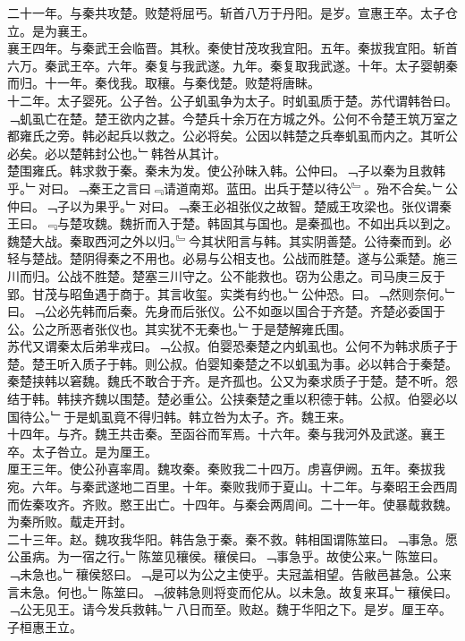 \documentclass{zhvt-classic}
\begin{document}
\hspace*{2em}二十一年。与秦共攻楚。败楚将屈丐。斩首八万于丹阳。是岁。宣惠王卒。太子仓立。是为襄王。\\
\hspace*{2em}襄王四年。与秦武王会临晋。其秋。秦使甘茂攻我宜阳。五年。秦拔我宜阳。斩首六万。秦武王卒。六年。秦复与我武遂。九年。秦复取我武遂。十年。太子婴朝秦而归。十一年。秦伐我。取穰。与秦伐楚。败楚将唐眛。\\
\hspace*{2em}十二年。太子婴死。公子咎。公子虮虱争为太子。时虮虱质于楚。苏代谓韩咎曰。﹁虮虱亡在楚。楚王欲内之甚。今楚兵十余万在方城之外。公何不令楚王筑万室之都雍氏之旁。韩必起兵以救之。公必将矣。公因以韩楚之兵奉虮虱而内之。其听公必矣。必以楚韩封公也。﹂韩咎从其计。\\
\hspace*{2em}楚围雍氏。韩求救于秦。秦未为发。使公孙昧入韩。公仲曰。﹁子以秦为且救韩乎。﹂对曰。﹁秦王之言曰﹃请道南郑。蓝田。出兵于楚以待公﹄。殆不合矣。﹂公仲曰。﹁子以为果乎。﹂对曰。﹁秦王必祖张仪之故智。楚威王攻梁也。张仪谓秦王曰。﹃与楚攻魏。魏折而入于楚。韩固其与国也。是秦孤也。不如出兵以到之。魏楚大战。秦取西河之外以归。﹄今其状阳言与韩。其实阴善楚。公待秦而到。必轻与楚战。楚阴得秦之不用也。必易与公相支也。公战而胜楚。遂与公乘楚。施三川而归。公战不胜楚。楚塞三川守之。公不能救也。窃为公患之。司马庚三反于郢。甘茂与昭鱼遇于商于。其言收玺。实类有约也。﹂公仲恐。曰。﹁然则奈何。﹂曰。﹁公必先韩而后秦。先身而后张仪。公不如亟以国合于齐楚。齐楚必委国于公。公之所恶者张仪也。其实犹不无秦也。﹂于是楚解雍氏围。\\
\hspace*{2em}苏代又谓秦太后弟芈戎曰。﹁公叔。伯婴恐秦楚之内虮虱也。公何不为韩求质子于楚。楚王听入质子于韩。则公叔。伯婴知秦楚之不以虮虱为事。必以韩合于秦楚。秦楚挟韩以窘魏。魏氏不敢合于齐。是齐孤也。公又为秦求质子于楚。楚不听。怨结于韩。韩挟齐魏以围楚。楚必重公。公挟秦楚之重以积德于韩。公叔。伯婴必以国待公。﹂于是虮虱竟不得归韩。韩立咎为太子。齐。魏王来。\\
\hspace*{2em}十四年。与齐。魏王共击秦。至函谷而军焉。十六年。秦与我河外及武遂。襄王卒。太子咎立。是为厘王。\\
\hspace*{2em}厘王三年。使公孙喜率周。魏攻秦。秦败我二十四万。虏喜伊阙。五年。秦拔我宛。六年。与秦武遂地二百里。十年。秦败我师于夏山。十二年。与秦昭王会西周而佐秦攻齐。齐败。愍王出亡。十四年。与秦会两周间。二十一年。使暴䳒救魏。为秦所败。䳒走开封。\\
\hspace*{2em}二十三年。赵。魏攻我华阳。韩告急于秦。秦不救。韩相国谓陈筮曰。﹁事急。愿公虽病。为一宿之行。﹂陈筮见穰侯。穰侯曰。﹁事急乎。故使公来。﹂陈筮曰。﹁未急也。﹂穰侯怒曰。﹁是可以为公之主使乎。夫冠盖相望。告敝邑甚急。公来言未急。何也。﹂陈筮曰。﹁彼韩急则将变而佗从。以未急。故复来耳。﹂穰侯曰。﹁公无见王。请今发兵救韩。﹂八日而至。败赵。魏于华阳之下。是岁。厘王卒。子桓惠王立。\\
\end{document}
